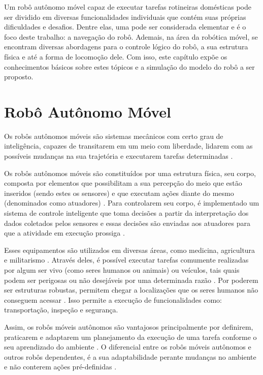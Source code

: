 
Um robô autônomo móvel capaz de executar tarefas rotineiras domésticas pode ser dividido em diversas funcionalidades individuais que contém suas próprias dificuldades e desafios. Dentre elas, uma pode ser considerada elementar e é o foco deste trabalho: a navegação do robô. Ademais, na área da robótica móvel, se encontram diversas abordagens para o controle lógico do robô, a sua estrutura física e até a forma de locomoção dele. Com isso, este capítulo expõe os conhecimentos básicos sobre estes tópicos e a simulação do modelo do robô a ser proposto.


\section{Robô Autônomo Móvel} %
Os robôs autônomos móveis são sistemas mecânicos com certo grau de inteligência,  capazes de transitarem em um meio com liberdade, lidarem com as possíveis mudanças na sua trajetória e executarem tarefas determinadas \cite{practicalIndroductionNehmzow:2012}. 

Os robôs autônomos móveis são constituídos por uma estrutura física, seu corpo, composta por elementos que possibilitam a sua percepção do meio que estão inseridos (sendo estes os sensores) e que executam ações diante do mesmo (denominados como atuadores) \cite{mobileRoboticsJaulin:2019}.
Para controlarem seu corpo, é implementado um sistema de controle inteligente que toma decisões a partir da interpretação dos dados coletados pelos sensores e essas decisões são enviadas aos atuadores para que a atividade em execução prossiga \cite{mobileRoboticsJaulin:2019}. 

Esses equipamentos são utilizados em diversas áreas, como medicina, agricultura e militarismo \cite{mobileRoboticsJaulin:2019}. 
Através deles, é possível executar tarefas comumente realizadas por algum ser vivo (como seres humanos ou animais) ou veículos, tais quais podem ser perigosas ou não desejáveis por uma determinada razão \cite{mathematicsModelsKelly:2013}.
Por poderem ser estruturas robustas,  permitem chegar a localizações que os seres humanos não conseguem acessar \cite{mobileRoboticsJaulin:2019}. 
Isso permite a execução de funcionalidades como: transportação, inspeção e segurança\cite{mobileRoboticsJaulin:2019}. 

Assim, os robôs móveis autônomos são vantajosos principalmente por definirem, praticarem e adaptarem um planejamento da execução de uma tarefa conforme o seu aprendizado do ambiente \cite{practicalIndroductionNehmzow:2012}. 
O diferencial entre os robôs móveis autônomos e outros robôs dependentes, é a sua adaptabilidade perante mudanças no ambiente e não conterem ações pré-definidas \cite{practicalIndroductionNehmzow:2012}.

